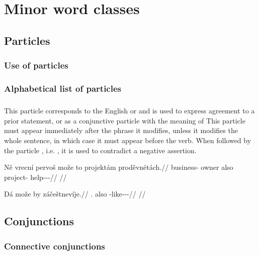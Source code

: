 \chapter{Minor word classes}\label{chap:minor}

\section{Particles}

\subsection{Use of particles}

\subsection{Alphabetical list of particles}

\paragraph{} This particle corresponds to the English  or  and is used to express agreement to a prior statement, or as a conjunctive particle with the meaning of  This particle must appear immediately after the phrase it modifies, unless it modifies the whole sentence, in which case it must appear before the verb. When followed by the particle , i.e. , it is used to contradict a negative assertion.

\pex
\begingl
    \gla Ně vrecn\'i pervoš mo\v{z}e to projekt\'am proděvn\'et\'ach.//
    \glb \Pl{} business-\Gen{} owner also \Dem{} project-\Agt{} help-\Pv{}-\Pot{}-\Ctp{}//
    \glft {}//
\endgl
\xe

\pex
\begingl
    \gla D\'a {mo\v{z}e by} z\'ačeštnev\'ije.//
    \glb \First{}\Sg{}.\Str{} also \Neg{}-like-\Pv{}-\Cont{}-\Quot{}//
    \glft {}//
\endgl
\xe

\section{Conjunctions}\label{sec:conj}

\subsection{Connective conjunctions}\label{sec:conn-conj}

